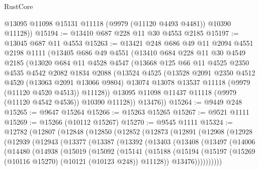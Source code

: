\begin{lexlean}{RustCore}
\begin{coremodule}
        @13095
        @11098
        @15131
        @11118
        (@9979 (@11120 @4493 @4481))
        @10390
        @11128))
@15194 := @13410 @687 @228 @11 @30 @4553 @2185
@15197 := @13045 @687 @11 @4553
@15263 := @13421
    @248
    @686
    @49
    @11
    @2094
    @4551
    @2198
    @1111
    (@13405
      @686
      @49
      @4551
      (@13410
        @684
        @228
        @11
        @30
        @4549
        @2185
        (@13020
          @684
          @11
          @4528
          @4547
          (@13668
            @125
            @66
            @11
            @4525
            @2350
            @4535
            @4542
            @2082
            @1834
            @2088
            (@13524
              @4525
              (@13528
                @2091
                @2350
                @4512
                @4520
                (@13063 @2091 @13066 @9804)
                @13074
                @13078
                @13537
                @11118
                (@9979 (@11120 @4520 @4513))
                @11128))
            @13095
            @11098
            @11437
            @11118
            (@9979 (@11120 @4542 @4536))
            @10390
            @11128))
        @13476))
@15264 := @9449 @248
@15265 := @9647 @15264
@15266 := @15263 @15265
@15267 := @9521 @1111
@15269 := @15266 (@10112 @15267)
@15270 := @9545 @1111
@15324 := @12782
    (@12807
      (@12848
        (@12850
          (@12852
            (@12873
              (@12891
                (@12908
                  (@12928
                    (@12939
                      (@12943
                        (@13377
                          (@13387
                            (@13392
                              (@13403
                                (@13408
                                  (@13497
                                    (@14006
                                      (@14480
                                        (@14938
                                          (@15019
                                            (@15092
                                              (@15141
                                                (@15188
                                                  (@15194
                                                    (@15197
                                                      (@15269
                                                        (@10116 @15270)
                                                        (@10121 (@10123 @248))
                                                        @11128))
                                                    @13476))))))))))

\end{coremodule}
\end{lexlean}
